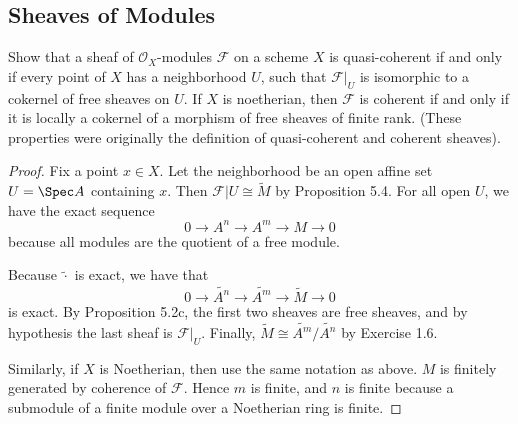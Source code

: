 \subsection{Sheaves of Modules}

\begin{exercise}%
	Show that a sheaf of $\mathcal{O}_X $-modules $\mathscr{F} $ on a scheme $X $ is quasi-coherent if and only if every point of $X $ has a neighborhood $U $, such that $\mathscr{F}|_U $ is isomorphic to a cokernel of free sheaves on $U $. If $X $ is noetherian, then $\mathscr{F} $ is coherent if and only if it is locally a cokernel of a morphism of free sheaves of finite rank. (These properties were originally the definition of quasi-coherent and coherent sheaves).
\end{exercise}
\begin{proof}
	Fix a point $x\in X $.
	Let the neighborhood be an open affine set $U = \Spec A $ containing $x $.
	Then $\mathscr{F}|U \cong \tilde{M} $ by Proposition 5.4.
	For all open $U $, we have the exact sequence
	\[
		0 \to A^{n} \to A^{m} \to M \to 0
	\] 
	because all modules are the quotient of a free module.

	Because $\tilde{\cdot}$ is exact, we have that
	\[
		0 \to \tilde{A^n} \to \tilde{A^m} \to \tilde{M} \to 0
	\] 
	is exact.
	By Proposition 5.2c, the first two sheaves are free sheaves, and by hypothesis the last sheaf is $\mathscr{F}|_U $.
	Finally, $\tilde{M} \cong \tilde{A^m} / \tilde{A^n} $ by Exercise 1.6.

	Similarly, if $X $ is Noetherian, then use the same notation as above.
	$M $ is finitely generated by coherence of $\mathscr{F} $.
	Hence $m $ is finite, and $n $ is finite because a submodule of a finite module over a Noetherian ring is finite.
\end{proof}

